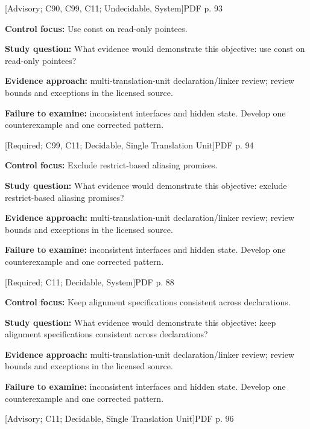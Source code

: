 \documentclass[10pt,letterpaper]{article}
\begin{document}
 \textsf{\footnotesize [Advisory; C90, C99, C11; Undecidable, System]}\hfill{\footnotesize PDF p. 93}\par
\textbf{Control focus:} Use const on read-only pointees.\par
\textbf{Study question:} What evidence would demonstrate this objective: use const on read-only pointees?\par
\textbf{Evidence approach:} multi-translation-unit declaration/linker review; review bounds and exceptions in the licensed source.\par
\textbf{Failure to examine:} inconsistent interfaces and hidden state. Develop one counterexample and one corrected pattern.\par
\smallskip
{}
 \textsf{\footnotesize [Required; C99, C11; Decidable, Single Translation Unit]}\hfill{\footnotesize PDF p. 94}\par
\textbf{Control focus:} Exclude restrict-based aliasing promises.\par
\textbf{Study question:} What evidence would demonstrate this objective: exclude restrict-based aliasing promises?\par
\textbf{Evidence approach:} multi-translation-unit declaration/linker review; review bounds and exceptions in the licensed source.\par
\textbf{Failure to examine:} inconsistent interfaces and hidden state. Develop one counterexample and one corrected pattern.\par
\smallskip
{}
 \textsf{\footnotesize [Required; C11; Decidable, System]}\hfill{\footnotesize PDF p. 88}\par
\textbf{Control focus:} Keep alignment specifications consistent across declarations.\par
\textbf{Study question:} What evidence would demonstrate this objective: keep alignment specifications consistent across declarations?\par
\textbf{Evidence approach:} multi-translation-unit declaration/linker review; review bounds and exceptions in the licensed source.\par
\textbf{Failure to examine:} inconsistent interfaces and hidden state. Develop one counterexample and one corrected pattern.\par
\smallskip
{}
 \textsf{\footnotesize [Advisory; C11; Decidable, Single Translation Unit]}\hfill{\footnotesize PDF p. 96}\par
\end{document}
